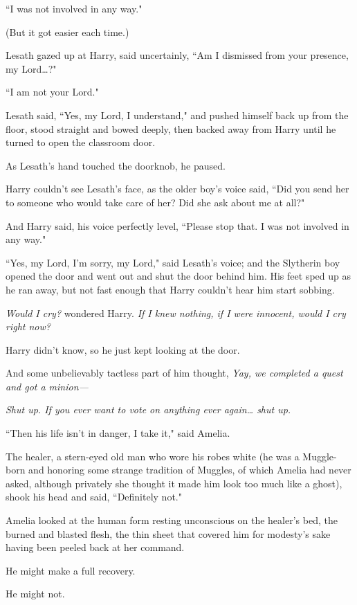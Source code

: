 ``I was not involved in any way."

(But it got easier each time.)

Lesath gazed up at Harry, said uncertainly, ``Am I dismissed from your presence, my Lord{\ldots}?"

``I am not your Lord."

Lesath said, ``Yes, my Lord, I understand," and pushed himself back up from the floor, stood straight and bowed deeply, then backed away from Harry until he turned to open the classroom door.

As Lesath's hand touched the doorknob, he paused.

Harry couldn't see Lesath's face, as the older boy's voice said, ``Did you send her to someone who would take care of her? Did she ask about me at all?"

And Harry said, his voice perfectly level, ``Please stop that. I was not involved in any way."

``Yes, my Lord, I'm sorry, my Lord," said Lesath's voice; and the Slytherin boy opened the door and went out and shut the door behind him. His feet sped up as he ran away, but not fast enough that Harry couldn't hear him start sobbing.

\emph{Would I cry?} wondered Harry. \emph{If I knew nothing, if I were innocent, would I cry right now?}

Harry didn't know, so he just kept looking at the door.

And some unbelievably tactless part of him thought, \emph{Yay, we completed a quest and got a minion---}

\emph{Shut up. If you ever want to vote on anything ever again{\ldots} shut up.}


``Then his life isn't in danger, I take it," said Amelia.

The healer, a stern-eyed old man who wore his robes white (he was a Muggle-born and honoring some strange tradition of Muggles, of which Amelia had never asked, although privately she thought it made him look too much like a ghost), shook his head and said, ``Definitely not."

Amelia looked at the human form resting unconscious on the healer's bed, the burned and blasted flesh, the thin sheet that covered him for modesty's sake having been peeled back at her command.

He might make a full recovery.

He might not.

